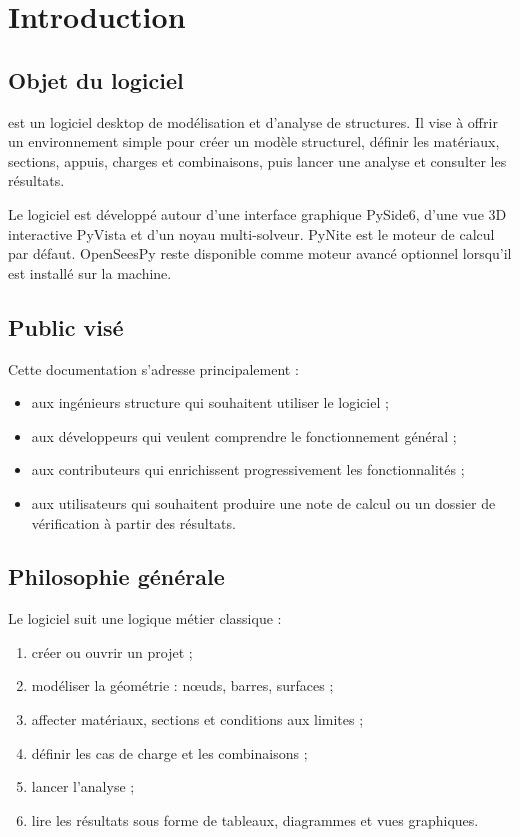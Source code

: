\chapter{Introduction}

\section{Objet du logiciel}

\logiciel{} est un logiciel desktop de modélisation et d'analyse de structures.
Il vise à offrir un environnement simple pour créer un modèle structurel,
définir les matériaux, sections, appuis, charges et combinaisons, puis lancer
une analyse et consulter les résultats.

Le logiciel est développé autour d'une interface graphique PySide6, d'une vue
3D interactive PyVista et d'un noyau multi-solveur. PyNite est le moteur de
calcul par défaut. OpenSeesPy reste disponible comme moteur avancé optionnel
lorsqu'il est installé sur la machine.

\section{Public visé}

Cette documentation s'adresse principalement :

\begin{itemize}
  \item aux ingénieurs structure qui souhaitent utiliser le logiciel ;
  \item aux développeurs qui veulent comprendre le fonctionnement général ;
  \item aux contributeurs qui enrichissent progressivement les fonctionnalités ;
  \item aux utilisateurs qui souhaitent produire une note de calcul ou un dossier
  de vérification à partir des résultats.
\end{itemize}

\section{Philosophie générale}

Le logiciel suit une logique métier classique :

\begin{enumerate}
  \item créer ou ouvrir un projet ;
  \item modéliser la géométrie : nœuds, barres, surfaces ;
  \item affecter matériaux, sections et conditions aux limites ;
  \item définir les cas de charge et les combinaisons ;
  \item lancer l'analyse ;
  \item lire les résultats sous forme de tableaux, diagrammes et vues graphiques.
\end{enumerate}

